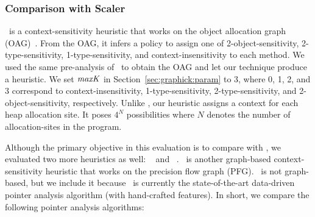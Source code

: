 \subsubsection{Comparison with Scaler}\label{sec:comparescaler}
\Scaler~is a context-sensitivity heuristic that works on the object allocation graph (OAG)~\cite{Li2018b}. From the OAG, it infers a policy to assign one of 2-object-sensitivity, 2-type-sensitivity, 1-type-sensitivity, and context-insensitivity to each method.
We used the same pre-analysis of \Scaler~to obtain the OAG and let our technique produce a heuristic.
We set ${\it maxK}$ in Section~\ref{sec:graphick:param} to 3, where 0, 1, 2, and 3 correspond to context-insensitivity, 1-type-sensitivity, 2-type-sensitivity, and 2-object-sensitivity, respectively.
Unlike \Scaler, our heuristic assigns a context for each heap allocation site.
It poses $4^N$ possibilities where $N$ denotes the number of allocation-sites in the program.

Although the primary  objective in this evaluation is to compare with \Scaler, we evaluated two more heuristics as well: \Zipper~\cite{Li2018a} and \Data~\cite{JeJeChOh17}.
\Zipper~is another graph-based context-sensitivity heuristic that works on the precision flow graph (PFG).
\Data~is not graph-based, but we include it because \Data~is currently the state-of-the-art data-driven pointer analysis algorithm (with hand-crafted features).
In short, we compare the following pointer analysis algorithms: %

